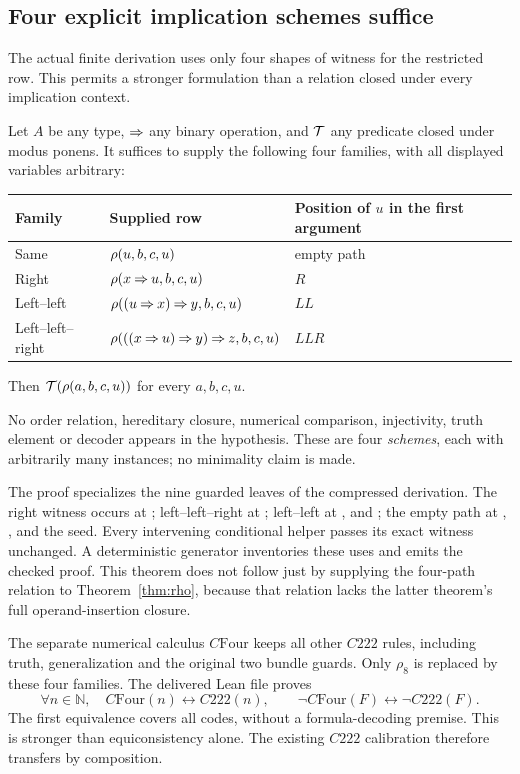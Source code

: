 \subsection{Four explicit implication schemes suffice}
\label{sec:four}
The actual finite derivation uses only four shapes of witness for the restricted row. This permits a stronger formulation than a relation closed under every implication context.

\begin{theorem}
Let $A$ be any type, $\mathbin{\Rightarrow}$ any binary operation, and $\mathcal T$ any predicate closed under modus ponens. It suffices to supply the following four families, with all displayed variables arbitrary:
\begin{center}
\begin{tabular}{lll}
\toprule
Family & Supplied row & Position of $u$ in the first argument\\
\midrule
Same & $\rho(u,b,c,u)$ & empty path\\
Right & $\rho(x\mathbin{\Rightarrow} u,b,c,u)$ & $R$\\
Left--left & $\rho((u\mathbin{\Rightarrow} x)\mathbin{\Rightarrow} y,b,c,u)$ & $LL$\\
Left--left--right & $\rho(((x\mathbin{\Rightarrow} u)\mathbin{\Rightarrow} y)\mathbin{\Rightarrow} z,b,c,u)$ & $LLR$\\
\bottomrule
\end{tabular}
\end{center}
Then $\mathcal T(\rho(a,b,c,u))$ for every $a,b,c,u$.
\end{theorem}
No order relation, hereditary closure, numerical comparison, injectivity, truth element or decoder appears in the hypothesis. These are four \emph{schemes}, each with arbitrarily many instances; no minimality claim is made.

The proof specializes the nine guarded leaves of the compressed derivation. The right witness occurs at ; left--left--right at ; left--left at ,  and ; the empty path at , ,  and the seed. Every intervening conditional helper passes its exact witness unchanged. A deterministic generator inventories these uses and emits the checked proof. This theorem does not follow just by supplying the four-path relation to Theorem~\ref{thm:rho}, because that relation lacks the latter theorem's full operand-insertion closure.

The separate numerical calculus $C\mathrm{Four}$ keeps all other $C222$ rules, including truth, generalization and the original two bundle guards. Only $\rho_8$ is replaced by these four families. The delivered Lean file  proves
\[
 \forall n\in\mathbb N,\quad C\mathrm{Four}(n)\longleftrightarrow C222(n),
 \qquad
 \neg C\mathrm{Four}(F)\longleftrightarrow\neg C222(F).
\]
The first equivalence covers all codes, without a formula-decoding premise. This is stronger than equiconsistency alone. The existing $C222$ calibration therefore transfers by composition.

